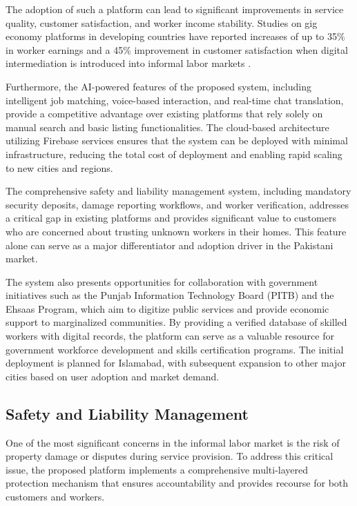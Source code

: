 \documentclass[12pt,a4paper]{report}
\begin{document}
The adoption of such a platform can lead to significant improvements in service quality, customer satisfaction, and worker income stability. Studies on gig economy platforms in developing countries have reported increases of up to 35\% in worker earnings and a 45\% improvement in customer satisfaction when digital intermediation is introduced into informal labor markets \cite{worldbank}.

Furthermore, the AI-powered features of the proposed system, including intelligent job matching, voice-based interaction, and real-time chat translation, provide a competitive advantage over existing platforms that rely solely on manual search and basic listing functionalities. The cloud-based architecture utilizing Firebase services ensures that the system can be deployed with minimal infrastructure, reducing the total cost of deployment and enabling rapid scaling to new cities and regions.

The comprehensive safety and liability management system, including mandatory security deposits, damage reporting workflows, and worker verification, addresses a critical gap in existing platforms and provides significant value to customers who are concerned about trusting unknown workers in their homes. This feature alone can serve as a major differentiator and adoption driver in the Pakistani market.

The system also presents opportunities for collaboration with government initiatives such as the Punjab Information Technology Board (PITB) and the Ehsaas Program, which aim to digitize public services and provide economic support to marginalized communities. By providing a verified database of skilled workers with digital records, the platform can serve as a valuable resource for government workforce development and skills certification programs. The initial deployment is planned for Islamabad, with subsequent expansion to other major cities based on user adoption and market demand.

\subsection{Safety and Liability Management}

One of the most significant concerns in the informal labor market is the risk of property damage or disputes during service provision. To address this critical issue, the proposed platform implements a comprehensive multi-layered protection mechanism that ensures accountability and provides recourse for both customers and workers.
\end{document}
